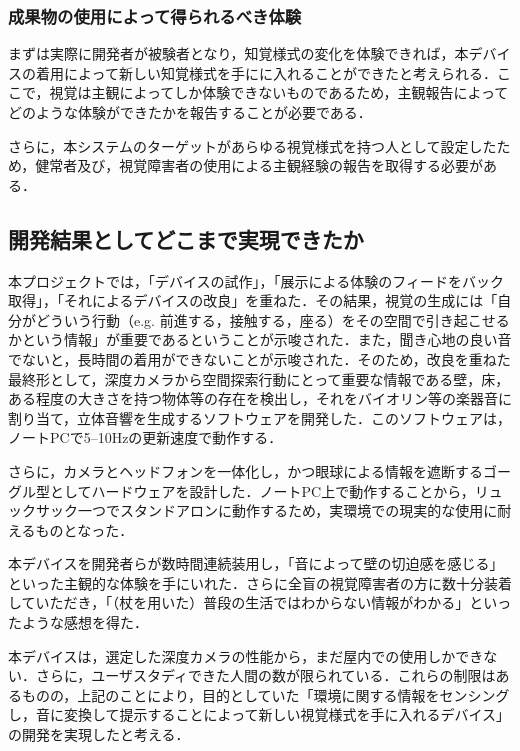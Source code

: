 \subsubsection{成果物の使用によって得られるべき体験}
まずは実際に開発者が被験者となり，知覚様式の変化を体験できれば，本デバイスの着用によって新しい知覚様式を手にに入れることができたと考えられる．ここで，視覚は主観によってしか体験できないものであるため，主観報告によってどのような体験ができたかを報告することが必要である．

さらに，本システムのターゲットがあらゆる視覚様式を持つ人として設定したため，健常者及び，視覚障害者の使用による主観経験の報告を取得する必要がある．

\subsection{開発結果としてどこまで実現できたか}
本プロジェクトでは，「デバイスの試作」，「展示による体験のフィードをバック取得」，「それによるデバイスの改良」を重ねた．その結果，視覚の生成には「自分がどういう行動（e.g. 前進する，接触する，座る）をその空間で引き起こせるかという情報」が重要であるということが示唆された．また，聞き心地の良い音でないと，長時間の着用ができないことが示唆された．そのため，改良を重ねた最終形として，深度カメラから空間探索行動にとって重要な情報である壁，床，ある程度の大きさを持つ物体等の存在を検出し，それをバイオリン等の楽器音に割り当て，立体音響を生成するソフトウェアを開発した．このソフトウェアは，ノートPCで5--10Hzの更新速度で動作する．

さらに，カメラとヘッドフォンを一体化し，かつ眼球による情報を遮断するゴーグル型としてハードウェアを設計した．ノートPC上で動作することから，リュックサック一つでスタンドアロンに動作するため，実環境での現実的な使用に耐えるものとなった．

本デバイスを開発者らが数時間連続装用し，「音によって壁の切迫感を感じる」といった主観的な体験を手にいれた．さらに全盲の視覚障害者の方に数十分装着していただき，「（杖を用いた）普段の生活ではわからない情報がわかる」といったような感想を得た．

本デバイスは，選定した深度カメラの性能から，まだ屋内での使用しかできない．さらに，ユーザスタディできた人間の数が限られている．これらの制限はあるものの，上記のことにより，目的としていた「環境に関する情報をセンシングし，音に変換して提示することによって新しい視覚様式を手に入れるデバイス」の開発を実現したと考える．

